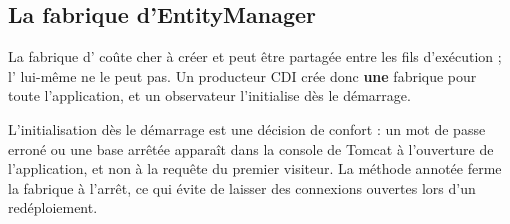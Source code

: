 \subsection{La fabrique d'EntityManager}
La fabrique d' coûte cher à créer et peut être partagée entre les fils d'exécution ; l'
lui-même ne le peut pas. Un producteur CDI crée donc \textbf{une} fabrique pour toute l'application, et un observateur
l'initialise dès le démarrage.



L'initialisation dès le démarrage est une décision de confort : un mot de passe erroné ou une base arrêtée apparaît dans
la console de Tomcat à l'ouverture de l'application, et non à la requête du premier visiteur. La méthode annotée
 ferme la fabrique à l'arrêt, ce qui évite de laisser des connexions ouvertes lors d'un redéploiement.

